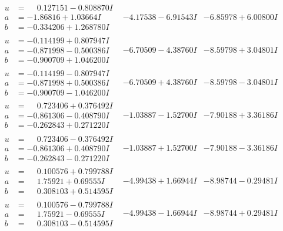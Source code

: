 \documentclass[1p]{elsarticle_modified}
\theoremstyle{definition}
\begin{document}
$$\begin{array}{c|c|c}
\begin{aligned}
u &= \phantom{-}0.127151 - 0.808870 I \\
a &= -1.86816 + 1.03664 I \\
b &= -0.334206 + 1.268780 I\end{aligned}
 & -4.17538 - 6.91543 I & -6.85978 + 6.00800 I \\ \hline\begin{aligned}
u &= -0.114199 + 0.807947 I \\
a &= -0.871998 - 0.500386 I \\
b &= -0.900709 + 1.046200 I\end{aligned}
 & -6.70509 - 4.38760 I & -8.59798 + 3.04801 I \\ \hline\begin{aligned}
u &= -0.114199 - 0.807947 I \\
a &= -0.871998 + 0.500386 I \\
b &= -0.900709 - 1.046200 I\end{aligned}
 & -6.70509 + 4.38760 I & -8.59798 - 3.04801 I \\ \hline\begin{aligned}
u &= \phantom{-}0.723406 + 0.376492 I \\
a &= -0.861306 - 0.408790 I \\
b &= -0.262843 + 0.271220 I\end{aligned}
 & -1.03887 - 1.52700 I & -7.90188 + 3.36186 I \\ \hline\begin{aligned}
u &= \phantom{-}0.723406 - 0.376492 I \\
a &= -0.861306 + 0.408790 I \\
b &= -0.262843 - 0.271220 I\end{aligned}
 & -1.03887 + 1.52700 I & -7.90188 - 3.36186 I \\ \hline\begin{aligned}
u &= \phantom{-}0.100576 + 0.799788 I \\
a &= \phantom{-}1.75921 + 0.69555 I \\
b &= \phantom{-}0.308103 + 0.514595 I\end{aligned}
 & -4.99438 + 1.66944 I & -8.98744 - 0.29481 I \\ \hline\begin{aligned}
u &= \phantom{-}0.100576 - 0.799788 I \\
a &= \phantom{-}1.75921 - 0.69555 I \\
b &= \phantom{-}0.308103 - 0.514595 I\end{aligned}
 & -4.99438 - 1.66944 I & -8.98744 + 0.29481 I \\ \hline\begin{aligned}

\end{aligned}
\end{array}$$
\end{document}

